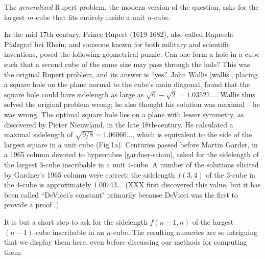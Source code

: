 \documentclass[superscriptaddress,reprint,amsmath,amssymb,aps]{revtex4-1}
\begin{document}
The {\it generalized} Rupert problem, the modern version of the question, asks for the largest $m$-cube that fits entirely inside a unit $n$-cube.

\vspace{.15in}


In the mid-17th century, Prince Rupert (1619-1682), also called Ruprecht Pfalzgraf bei Rhein, and someone known for both military and scientific inventions, posed the following geometrical puzzle: Can one form a hole in a cube such that a second cube of the same size may pass through the hole?
This was the original Rupert problem, and its answer is ``yes''.  John Wallis [wallis], placing a square hole on the plane normal to the cube's main diagonal, found that the square hole could have sidelength as large as $\sqrt{6}-\sqrt{2}=1.03527...$.  Wallis thus solved the original problem wrong; he also thought his solution was maximal – he was wrong.  The optimal square hole lies on a plane with lesser symmetry, as discovered by Pieter Nieuwland, in the late 18th-century.  He calculated a maximal sidelength of $\sqrt{9/8} = 1.06066...$, which is equivalent to the side of the largest square in a unit cube (Fig.1a). Centuries passed before Martin Garder, in a 1965 column devoted to hypercubes [gardner-sciam], asked for the sidelength of the largest 3-cube inscribable in a unit 4-cube. A number of the solutions elicited by Gardner's 1965 column were correct: the sidelength $f(3,4)$ of the 3-cube in the 4-cube is approximately $1.00743...$ (XXX first discovered this value, but it has been called ``DeVicci's constant" \cite{finch} primarily because DeVicci was the first to provide a proof \cite{devicci-shultz}.)

It is but a short step to ask for the sidelength $f(n-1,n)$ of the largest $(n-1)$-cube inscribable in an $n$-cube.  The resulting numerics are so intriguing that we display them here, even before discussing our methods for computing them:
\end{document}
